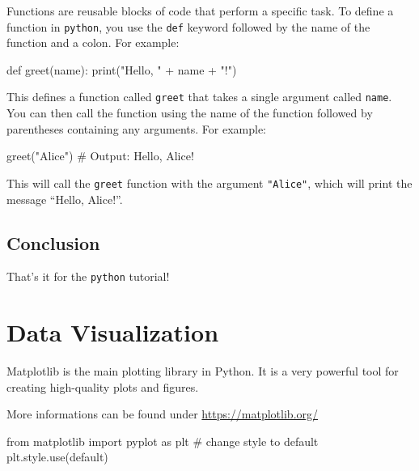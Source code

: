 \documentclass[
  letterpaper,
]{article}
\newenvironment{Shaded}{\begin{snugshade}}{\end{snugshade}}
\newcommand{\BuiltInTok}[1]{\textcolor[rgb]{0.00,0.23,0.31}{#1}}
\newcommand{\CommentTok}[1]{\textcolor[rgb]{0.37,0.37,0.37}{#1}}
\newcommand{\ImportTok}[1]{\textcolor[rgb]{0.00,0.46,0.62}{#1}}
\newcommand{\KeywordTok}[1]{\textcolor[rgb]{0.00,0.23,0.31}{#1}}
\newcommand{\NormalTok}[1]{\textcolor[rgb]{0.00,0.23,0.31}{#1}}
\newcommand{\OperatorTok}[1]{\textcolor[rgb]{0.37,0.37,0.37}{#1}}
\newcommand{\StringTok}[1]{\textcolor[rgb]{0.13,0.47,0.30}{#1}}
\begin{document}
Functions are reusable blocks of code that perform a specific task. To
define a function in \texttt{python}, you use the \texttt{def} keyword
followed by the name of the function and a colon. For example:

\begin{Shaded}
\begin{Highlighting}[]
\KeywordTok{def}\NormalTok{ greet(name):}
  \BuiltInTok{print}\NormalTok{(}\StringTok{"Hello, "} \OperatorTok{+}\NormalTok{ name }\OperatorTok{+} \StringTok{"!"}\NormalTok{)}
\end{Highlighting}
\end{Shaded}

This defines a function called \texttt{greet} that takes a single
argument called \texttt{name}. You can then call the function using the
name of the function followed by parentheses containing any arguments.
For example:

\begin{Shaded}
\begin{Highlighting}[]
\NormalTok{greet(}\StringTok{"Alice"}\NormalTok{) }\CommentTok{\# Output: Hello, Alice!}
\end{Highlighting}
\end{Shaded}

This will call the \texttt{greet} function with the argument
\texttt{"Alice"}, which will print the message ``Hello, Alice!''.

\hypertarget{conclusion}{%
\subsection{Conclusion}\label{conclusion}}

That's it for the \texttt{python} tutorial!

\hypertarget{data-visualization}{%
\section{Data Visualization}\label{data-visualization}}

Matplotlib is the main plotting library in Python. It is a very powerful
tool for creating high-quality plots and figures.

More informations can be found under \url{https://matplotlib.org/}

\begin{Shaded}
\begin{Highlighting}[]
\ImportTok{from}\NormalTok{ matplotlib }\ImportTok{import}\NormalTok{ pyplot }\ImportTok{as}\NormalTok{ plt}
\CommentTok{\# change style to default }
\NormalTok{plt.style.use(}\StringTok{\textquotesingle{}default\textquotesingle{}}\NormalTok{)}
\end{Highlighting}
\end{Shaded}
\end{document}
